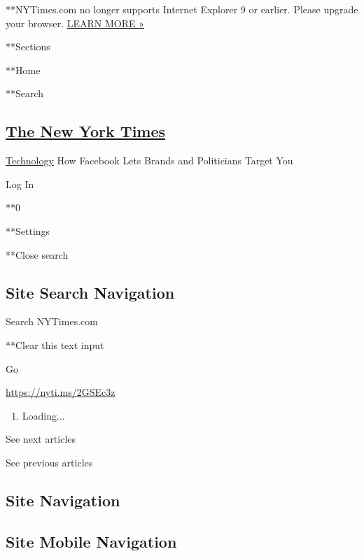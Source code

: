  **NYTimes.com no longer supports Internet Explorer 9 or earlier. Please
upgrade your browser.
\href{http://www.nytimes3xbfgragh.onion/content/help/site/ie9-support.html}{LEARN
MORE »}

**Sections

**Home

**Search

\hypertarget{the-new-york-times}{%
\subsection{\texorpdfstring{\href{http://www.nytimes3xbfgragh.onion/}{The
New York Times}}{The New York Times}}\label{the-new-york-times}}


\href{https://www.nytimes3xbfgragh.onion/section/technology}{Technology}
\textbar{}How Facebook Lets Brands and Politicians Target You

Log In

**0

**Settings

**Close search

\hypertarget{site-search-navigation}{%
\subsection{Site Search Navigation}\label{site-search-navigation}}

Search NYTimes.com

**Clear this text input

Go

\url{https://nyti.ms/2GSEc3z}

\begin{enumerate}
\def\labelenumi{\arabic{enumi}.}
\item
  Loading...
\end{enumerate}

See next articles

See previous articles

\hypertarget{site-navigation}{%
\subsection{Site Navigation}\label{site-navigation}}

\hypertarget{site-mobile-navigation}{%
\subsection{Site Mobile Navigation}\label{site-mobile-navigation}}

